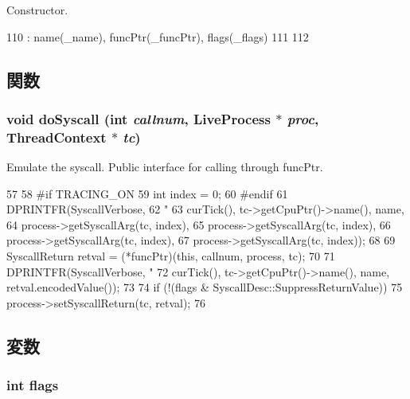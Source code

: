 Constructor. 


\begin{DoxyCode}
110         : name(_name), funcPtr(_funcPtr), flags(_flags)
111     {
112     }
\end{DoxyCode}


\subsection{関数}
\hypertarget{classSyscallDesc_a8a1b93297498c16444130f7ce9a12304}{
\subsubsection[{doSyscall}]{\setlength{\rightskip}{0pt plus 5cm}void doSyscall (int {\em callnum}, \/  {\bf LiveProcess} $\ast$ {\em proc}, \/  {\bf ThreadContext} $\ast$ {\em tc})}}
\label{classSyscallDesc_a8a1b93297498c16444130f7ce9a12304}


Emulate the syscall. Public interface for calling through funcPtr. 


\begin{DoxyCode}
57 {
58 #if TRACING_ON
59     int index = 0;
60 #endif
61     DPRINTFR(SyscallVerbose,
62              "%
63              curTick(), tc->getCpuPtr()->name(), name,
64              process->getSyscallArg(tc, index),
65              process->getSyscallArg(tc, index),
66              process->getSyscallArg(tc, index),
67              process->getSyscallArg(tc, index));
68 
69     SyscallReturn retval = (*funcPtr)(this, callnum, process, tc);
70 
71     DPRINTFR(SyscallVerbose, "%
72              curTick(), tc->getCpuPtr()->name(), name, retval.encodedValue());
73 
74     if (!(flags & SyscallDesc::SuppressReturnValue))
75         process->setSyscallReturn(tc, retval);
76 }
\end{DoxyCode}


\subsection{変数}
\hypertarget{classSyscallDesc_ac8bf36fe0577cba66bccda3a6f7e80a4}{
\subsubsection[{flags}]{\setlength{\rightskip}{0pt plus 5cm}int {\bf flags}}}
\label{classSyscallDesc_ac8bf36fe0577cba66bccda3a6f7e80a4}


